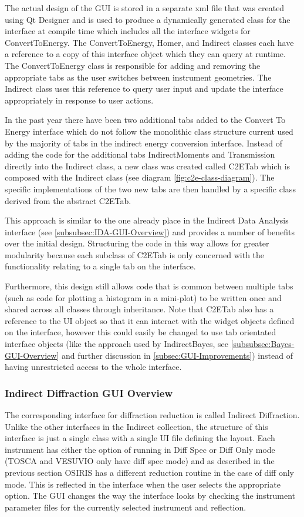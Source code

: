 \documentclass[paper=a4, fontsize=11pt]{scrartcl}	%
\numberwithin{equation}{section}															%
\numberwithin{figure}{section}																%
\numberwithin{table}{section}																%
\begin{document}
The actual design of the GUI is stored in a separate xml file that was created using Qt Designer and is used to produce a dynamically generated class for the interface at compile time which includes all the interface widgets for ConvertToEnergy. The ConvertToEnergy, Homer, and Indirect classes each have a reference to a copy of this interface object which they can query at runtime. The ConvertToEnergy class is responsible for adding and removing the appropriate tabs as the user switches between instrument geometries. The Indirect class uses this reference to query user input and update the interface appropriately in response to user actions.

In the past year there have been two additional tabs added to the Convert To Energy interface which do not follow the monolithic class structure current used by the majority of tabs in the indirect energy conversion interface. Instead of adding the code for the additional tabs IndirectMoments and Transmission directly into the Indirect class, a new class was created called C2ETab which is composed with the Indirect class (see diagram \ref{fig:c2e-class-diagram}). The specific implementations of the two new tabs are then handled by a specific class derived from the abstract C2ETab.

This approach is similar to the one already place in the Indirect Data Analysis interface (see \ref{subsubsec:IDA-GUI-Overview}) and provides a number of benefits over the initial design. Structuring the code in this way allows for greater modularity because each subclass of C2ETab is only concerned with the functionality relating to a single tab on the interface.

Furthermore, this design still allows code that is common between multiple tabs (such as code for plotting a histogram in a mini-plot) to be written once and shared across all classes through inheritance. Note that C2ETab also has a reference to the UI object so that it can interact with the widget objects defined on the interface, however this could easily be changed to use tab orientated interface objects (like the approach used by IndirectBayes, see \ref{subsubsec:Bayes-GUI-Overview} and further discussion in \ref{subsec:GUI-Improvements}) instead of having unrestricted access to the whole interface.

\subsubsection{Indirect Diffraction GUI Overview}
The corresponding interface for diffraction reduction is called Indirect Diffraction. Unlike the other interfaces in the Indirect collection, the structure of this interface is just a single class with a single UI file defining the layout. Each instrument has either the option of running in Diff Spec or Diff Only mode (TOSCA and VESUVIO only have diff spec mode) and as described in the previous section OSIRIS has a different reduction routine in the case of diff only mode. This is reflected in the interface when the user selects the appropriate option. The GUI changes the way the interface looks by checking the instrument parameter files for the currently selected instrument and reflection.
\end{document}
